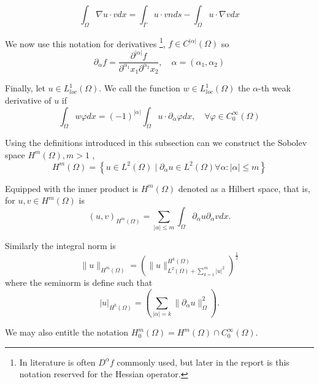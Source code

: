 \[
\int_{\Omega }^{} \nabla u \cdot v dx = \int_{\Gamma }^{} u\cdot v n ds - \int_{\Omega }^{} u \cdot \nabla v dx
\]

We now use this notation for derivatives \footnote{In literature is often $D^{\alpha } f$ commonly used, but later in the report is this notation reserved for the Hessian operator. }, $f \in C^{\left\lvert \alpha  \right\rvert } \left( \Omega  \right) $ so \[
\partial _{\alpha  } f = \frac{\partial ^{\left\lvert \alpha  \right\rvert } f}{ \partial ^{\alpha _{1} } x_{1} \partial ^{\alpha _{2}} x_{2}  }, \quad \alpha=\left( \alpha _{1}, \alpha _{2} \right)
\]


Finally, let $u \in  L^{1}_{loc}\left( \Omega  \right) $. We call the function $w \in L_{loc}^{1}\left( \Omega  \right) $ the $\alpha $-th weak derivative of $u$  if \[
\int_{\Omega }^{} w \varphi  dx = \left( -1 \right) ^{\left\lvert \alpha  \right\rvert } \int_{\Omega }^{} u \cdot \partial _{\alpha } \varphi dx, \quad \forall \varphi \in  C_{0}^{\infty}\left( \Omega  \right)
\]

Using the definitions introduced in this subsection can we construct the Sobolev space $H^{m}\left( \Omega  \right) , m>1$ , \[
H^{m}\left( \Omega  \right) = \left\{ u \in L^{2}\left( \Omega  \right)  \mid  \partial _{\alpha } u \in L^{2}\left( \Omega  \right)  \forall \alpha : \left\lvert \alpha  \right\rvert  \le m \right\}
\]

Equipped with the inner product is $H^{m}\left( \Omega  \right) $  denoted as a Hilbert space, that is, for $u,v \in H^{m}\left( \Omega  \right) $ is \[
    \left( u,v \right) _{H^{m}\left( \Omega   \right) } = \sum_{\left\lvert \alpha  \right\rvert  \le  m}^{}  \int_{\Omega }^{} \partial _{\alpha } u \partial _{\alpha } v dx.
\]

Similarly the integral norm is \[
\| u \|_{ H^{m}\left( \Omega  \right)  }^{  }  = \left( \| u \|_{ L^{2}\left( \Omega  \right)  + \sum_{k = 1}^{m}  \left\lvert u \right\rvert ^{2}  }^{  H^{k}\left( \Omega  \right) }  \right) ^{\frac{1}{2}}
\]
where the seminorm is define such that \[
\left\lvert u \right\rvert _{H^{k}\left( \Omega  \right) } = \left( \sum_{\left\lvert \alpha  \right\rvert  = k}^{} \| \partial _{\alpha }u \|_{ \Omega  }^{ 2 }  \right).
\]

We may also entitle the notation $H^{m}_{0} \left( \Omega  \right) = H^{m} \left( \Omega  \right) \cap C^{\infty}_{0} \left( \Omega  \right) $.





